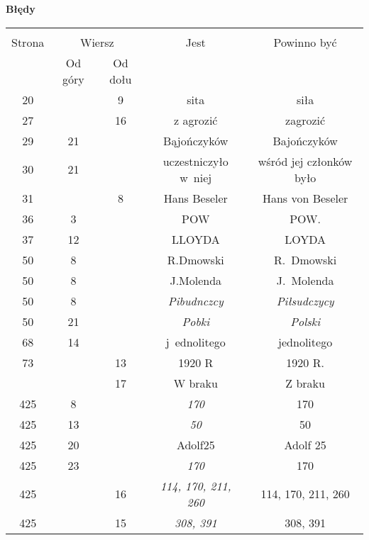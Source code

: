 \documentclass[a4paper,11pt]{article}
\newcommand{\tb}{\textbf}
\newcommand{\Center}[1]{\begin{center} #1 \end{center}}
\newcommand{\CenterTB}[1]{\Center{\tb{#1}}}
\begin{document}
\CenterTB{Błędy}
\begin{center}
  \begin{tabular}{|c|c|c|c|c|}
    \hline
    & \multicolumn{2}{c|}{} & & \\
    Strona & \multicolumn{2}{c|}{Wiersz}& Jest & Powinno być \\ \cline{2-3}
    & Od góry & Od dołu &  &  \\ \hline
    20 & &  9 & sita & siła \\
    27 & & 16 & z agrozić & zagrozić \\
    29 & 21 & & Bąjończyków & Bajończyków \\
    30 & 21 & & uczestniczyło w~niej & wśród jej członków było \\
    31 & & 8 & Hans Beseler & Hans von Beseler \\
    36 &  3 & & POW & POW. \\
    37 & 12 & & LLOYDA & LOYDA \\
    50 &  8 & & R.Dmowski & R.~Dmowski \\
    50 &  8 & & J.Molenda & J.~Molenda \\
    50 &  8 & & \emph{Pibudnczcy} & \emph{Piłsudczycy} \\
    50 & 21 & & \emph{Pobki} & \emph{Polski} \\
    68 & 14 & & j~ednolitego & jednolitego \\
    73 & & 13 & 1920 R & 1920 R. \\
    & & 17 & W braku & Z braku \\
    425 &  8 & & \emph{170} & 170 \\
    425 & 13 & & \emph{50}  & 50 \\
    425 & 20 & & Adolf25 & Adolf 25 \\
    425 & 23 & & \emph{170} & 170 \\
    425 & & 16 & \emph{114, 170, 211, 260} & 114, 170, 211, 260 \\
    425 & & 15 & \emph{308, 391} & 308, 391 \\

\end{tabular}
\end{center}
\end{document}
